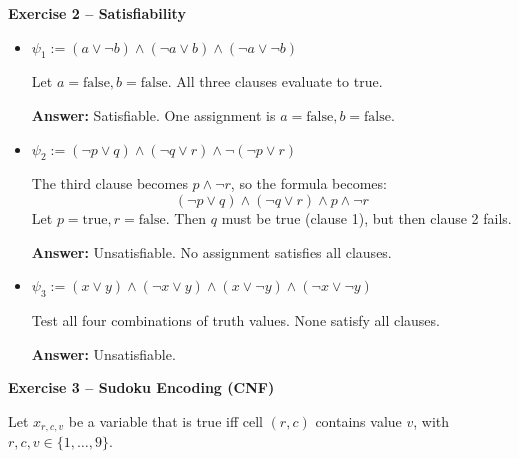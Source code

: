 \documentclass{article}
\theoremstyle{theorem}
\theoremstyle{definition}
\theoremstyle{remark}
\begin{document}
\vspace{1em}
\textbf{Exercise 2 – Satisfiability}

\begin{itemize}
    \item \(\psi_1 := (a \lor \neg b) \land (\neg a \lor b) \land (\neg a \lor \neg b)\)

    Let \(a = \text{false}, b = \text{false}\). All three clauses evaluate to true.

    \textbf{Answer:} Satisfiable. One assignment is \(a = \text{false}, b = \text{false}\).

    \item \(\psi_2 := (\neg p \lor q) \land (\neg q \lor r) \land \neg(\neg p \lor r)\)

    The third clause becomes \(p \land \neg r\), so the formula becomes:
    \[
    (\neg p \lor q) \land (\neg q \lor r) \land p \land \neg r
    \]
    Let \(p = \text{true}, r = \text{false}\). Then \(q\) must be true (clause 1), but then clause 2 fails.

    \textbf{Answer:} Unsatisfiable. No assignment satisfies all clauses.

    \item \(\psi_3 := (x \lor y) \land (\neg x \lor y) \land (x \lor \neg y) \land (\neg x \lor \neg y)\)

    Test all four combinations of truth values. None satisfy all clauses.

    \textbf{Answer:} Unsatisfiable.
\end{itemize}

\vspace{1em}
\textbf{Exercise 3 – Sudoku Encoding (CNF)}

Let \(x_{r,c,v}\) be a variable that is true iff cell \((r, c)\) contains value \(v\), with \(r, c, v \in \{1, \dots, 9\}\).
\end{document}
